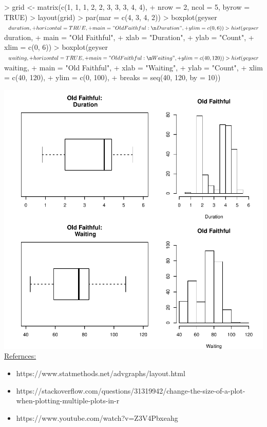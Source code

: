 \documentclass[12pt,letterpaper,final]{article}
\begin{document}
\begin{enumerate}
\begin{enumerate}
\begin{Schunk}
\begin{Sinput}
> grid <- matrix(c(1, 1, 1, 2, 2, 3, 3, 3, 4, 4), 
+               nrow = 2, ncol = 5, byrow = TRUE)
> layout(grid)
> par(mar = c(4, 3, 4, 2))
> boxplot(geyser$duration,
+         horizontal = TRUE,
+         main = "Old Faithful:\n Duration",
+         ylim = c(0, 6))
> hist(geyser$duration,
+      main = "Old Faithful",
+      xlab = "Duration",
+      ylab = "Count",
+      xlim = c(0, 6))
> boxplot(geyser$waiting,
+         horizontal = TRUE,
+         main = "Old Faithful:\n Waiting",
+         ylim = c(40, 120))
> hist(geyser$waiting,
+      main = "Old Faithful",
+      xlab = "Waiting",
+      ylab = "Count",
+      xlim = c(40, 120),
+      ylim = c(0, 100),
+      breaks = seq(40, 120, by = 10))
\end{Sinput}
\end{Schunk}
\includegraphics{rnw_template-005}
\underline{Refernces:}
\begin{itemize}
\item https://www.statmethods.net/advgraphs/layout.html
\item https://stackoverflow.com/questions/31319942/change-the-size-of-a-plot-when-plotting-multiple-plots-in-r
\item https://www.youtube.com/watch?v=Z3V4Pbxeahg
\end{itemize}


\end{enumerate}
\end{enumerate}
\end{document}
